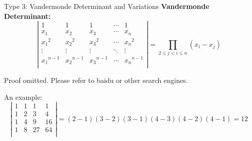 \documentclass{beamer}
\begin{document}
\begin{frame}{Type 3: Vandermonde Determinant and Variations}
\textbf{Vandermonde Determinant:}
\begin{equation*}
    \left| \begin{matrix}
        1&		1&		1&		\cdots&		1\\
        x_1&		x_2&		x_3&		\cdots&		x_n\\
        {x_1}^2&		{x_2}^2&		{x_3}^2&		\cdots&		{x_n}^2\\
        \vdots&		\vdots&		\vdots&		\ddots&		\vdots\\
        {x_1}^{n-1}&		{x_2}^{n-1}&		{x_3}^{n-1}&		\cdots&		{x_n}^{n-1}\\
    \end{matrix} \right|=\prod_{2\leqslant j<i\leqslant n}{\left( x_i-x_j \right)}
\end{equation*}

Proof omitted. Please refer to baidu or other search engines.

\vspace{3pt}
An example:
\begin{equation*}
    \left| \begin{matrix}
        1&		1&		1&		1\\
        1&		2&		3&		4\\
        1&		4&		9&		16\\
        1&		8&		27&		64\\
    \end{matrix} \right|=\left( 2-1 \right) \left( 3-2 \right) \left( 3-1 \right) \left( 4-3 \right) \left( 4-2 \right) \left( 4-1 \right) =12
\end{equation*}
\end{frame}
\end{document}
